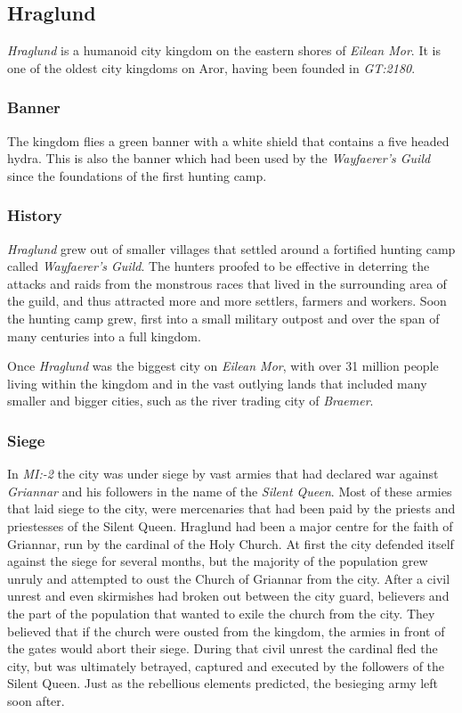 \subsection{Hraglund}

\emph{Hraglund} is a humanoid city kingdom on the eastern shores of
\emph{Eilean Mor}. It is one of the oldest city kingdoms on Aror, having been
founded in \emph{GT:2180}.

\subsubsection*{Banner}

The kingdom flies a green banner with a white shield that contains a five
headed hydra. This is also the banner which had been used by the
\emph{Wayfaerer's Guild} since the foundations of the first hunting camp.

\subsubsection*{History}

\emph{Hraglund} grew out of smaller villages that settled around a fortified
hunting camp called \emph{Wayfaerer's Guild}. The hunters proofed to be
effective in deterring the attacks and raids from the monstrous races that
lived in the surrounding area of the guild, and thus attracted more and more
settlers, farmers and workers. Soon the hunting camp grew, first into a small
military outpost and over the span of many centuries into a full kingdom.

Once \emph{Hraglund} was the biggest city on \emph{Eilean Mor}, with over
31 million people living within the kingdom and in the vast outlying lands
that included many smaller and bigger cities, such as the river trading city
of \emph{Braemer}.

\subsubsection*{Siege}

In \emph{MI:-2} the city was under siege by vast armies that had declared war
against \emph{Griannar} and his followers in the name of the
\emph{Silent Queen}. Most of these armies that laid siege to the city, were
mercenaries that had been paid by the priests and priestesses of the Silent
Queen. Hraglund had been a major centre for the faith of Griannar, run by the
cardinal of the Holy Church. At first the city defended itself against the
siege for several months, but the majority of the population grew unruly and
attempted to oust the Church of Griannar from the city. After a civil unrest
and even skirmishes had broken out between the city guard, believers and the
part of the population that wanted to exile the church from the city. They
believed that if the church were ousted from the kingdom, the armies in front
of the gates would abort their siege. During that civil unrest the cardinal
fled the city, but was ultimately betrayed, captured and executed by the
followers of the Silent Queen. Just as the rebellious elements predicted, the
besieging army left soon after.

